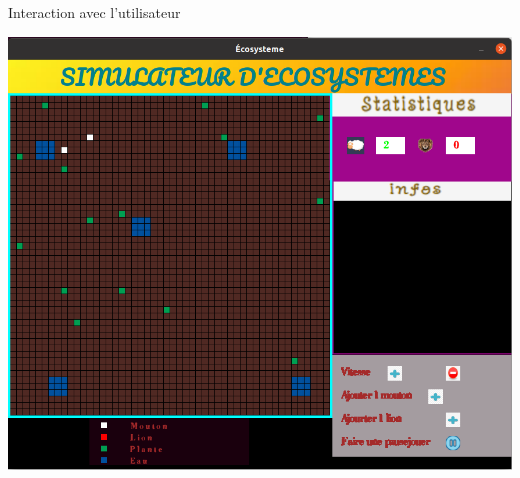 \documentclass{beamer}
\begin{document}
\begin{frame}{Interaction avec l'utilisateur}
    \begin{center}
            \includegraphics[keepaspectratio, scale=0.22]{images/interact.png}
    \end{center}
\end{frame}
\end{document}
